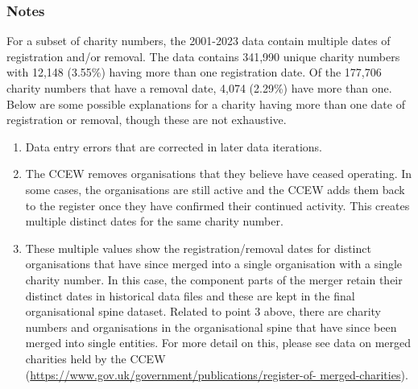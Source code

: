 \documentclass{article}
\begin{document}
\subsubsection{Notes}
For   a   subset   of   charity   numbers,   the 2001-2023  data   contain   multiple   dates   of   registration   and/or
removal. The data contains 341,990 unique charity numbers with 12,148 (3.55\%) having more
than one registration date. Of the 177,706 charity numbers that have a removal date, 4,074
(2.29\%) have more than one. 
Below are some possible explanations for a charity having more than one date of registration or
removal, though these are not exhaustive. 
\begin{enumerate}
  \item Data entry errors that are corrected in later data iterations.
\item The CCEW removes organisations that they believe have ceased operating. In some
cases, the organisations are still active and the CCEW adds them back to the register
once they have confirmed their continued activity. This creates multiple distinct dates
for the same charity number. 
\item These multiple values show the registration/removal dates for distinct organisations that
have since merged into a single organisation with a single charity number. In this case,
the component parts of the merger retain their distinct dates in historical data files and
these are kept in the final organisational spine dataset. 
Related to point 3 above, there are charity numbers and organisations in the organisational spine
that have since been merged into single entities. For more detail on this, please see data on
merged charities held by the CCEW (\url{https://www.gov.uk/government/publications/register-of-
merged-charities}). 
\end{enumerate}
\end{document}
